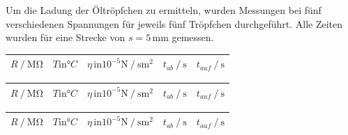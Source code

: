 Um die Ladung der Öltröpfchen zu ermitteln, wurden Messungen bei fünf verschiedenen Spannungen für jeweils fünf Tröpfchen durchgeführt.
Alle Zeiten wurden für eine Strecke von $s = 5 \, \unit{\milli\meter}$ gemessen.
\begin{table}[H]
    \caption{Messdaten der Öltröpfchen für verschiedene Spannungen}
    \label{tab:v_werte}
    \centering
    \begin{minipage}[t]{1\textwidth}
        \small
        \label{stab:v157}
        \begin{table}[H]
            \centering
            \begin{tabular}{S S S S S}
              \toprule
                {$R \mathbin{/} \unit{\mega\ohm} $}& {$T \text{in} °C $} & {$\eta \, \text{in} 10^{-5} \unit{\newton}\mathbin{/} \unit{\second\meter}^2$} & {$ t_{ab} \mathbin{/} \unit{\second}$} & {$ t_{auf} \mathbin{/} \unit{\second}$}\\
              \midrule
              
              \bottomrule
            \end{tabular}
          \end{table}
        
    \end{minipage}\qquad
    \begin{minipage}[t]{1\textwidth}
        \small
        \label{stab:v175}
        \begin{table}[H]
            \centering
            \begin{tabular}{S S S S S}
              \toprule
                {$R \mathbin{/} \unit{\mega\ohm} $} & {$T \text{in} °C $} & {$\eta \, \text{in} 10^{-5} \unit{\newton}\mathbin{/} \unit{\second\meter}^2$}&{$ t_{ab} \mathbin{/} \unit{\second}$} & {$ t_{auf} \mathbin{/} \unit{\second}$}\\
              \midrule
              
              \bottomrule
            \end{tabular}
          \end{table}
        
    \end{minipage}\qquad
    \begin{minipage}[t]{1\textwidth}
        \small
        \label{stab:v200}
        \begin{table}[H]
            \centering
            \begin{tabular}{S S S S S}
              \toprule
                {$R \mathbin{/} \unit{\mega\ohm} $} & {$T \text{in} °C $} & {$\eta \, \text{in} 10^{-5} \unit{\newton}\mathbin{/} \unit{\second\meter}^2$}&{$ t_{ab} \mathbin{/} \unit{\second}$} & {$ t_{auf} \mathbin{/} \unit{\second}$}\\
              \midrule
              

\end{tabular}
\end{table}
\end{minipage}
\end{table}
